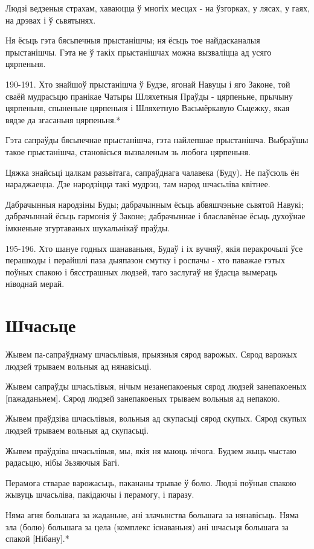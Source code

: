 \documentclass{article}
\begin{document}
Людзі ведзеныя страхам, хаваюцца ў многіх месцах - на ўзгорках, у
лясах, у гаях, на дрэвах і ў сьвятынях.

Ня ёсьць гэта бясьпечныя прыстанішчы; ня ёсьць тое найдасканалыя
прыстанішчы. Гэта не ў такіх прыстанішчах можна вызваліцца ад усяго
цярпеньня.

190-191. Хто знайшоў прыстанішча ў Будзе, ягонай Навуцы і яго Законе,
той сваёй мудрасьцю пранікае Чатыры Шляхетныя Праўды - цярпеньне,
прычыну цярпеньня, спыненьне цярпеньня і Шляхетную Васьмёркавую Сьцежку,
якая вядзе да згасаньня цярпеньня.*

Гэта сапраўды бясьпечнае прыстанішча, гэта найлепшае прыстанішча.
Выбраўшы такое прыстанішча, становісься вызваленым зь любога цярпеньня.

Цяжка знайсьці цалкам разьвітага, сапраўднага чалавека (Буду). Не
паўсюль ён нараджаецца. Дзе народзіцца такі мудрэц, там народ шчасьліва
квітнее.

Дабрачынныя народзіны Буды; дабрачынным ёсьць абвяшчэньне сьвятой
Навукі; дабрачыннай ёсьць гармонія ў Законе; дабрачыннае і блаславёнае
ёсьць духоўнае імкненьне згуртаваных шукальнікаў праўды.

195-196. Хто шануе годных шанаваньня, Будаў і іх вучняў, якія
перакрочылі ўсе перашкоды і перайшлі паза дыяпазон смутку і роспачы -
хто паважае гэтых поўных спакою і бясстрашных людзей, таго заслугаў ня
ўдасца вымераць ніводнай мерай.

\section{Шчасьце}

Жывем па-сапраўднаму шчасьлівыя, прыязныя сярод варожых. Сярод
варожых людзей трываем вольныя ад нянавісьці.

Жывем сапраўды шчасьлівыя, нічым незанепакоеныя сярод людзей
занепакоеных {[}пажаданьнем{]}. Сярод людзей занепакоеных трываем
вольныя ад непакою.

Жывем праўдзіва шчасьлівыя, вольныя ад скупасьці сярод скупых.
Сярод скупых людзей трываем вольныя ад скупасьці.

Жывем праўдзіва шчасьлівыя, мы, якія ня маюць нічога. Будзем жыць
чыстаю радасьцю, нібы Зьзяючыя Багі.

Перамога стварае варожасьць, пакананы трывае ў болю. Людзі поўныя
спакою жывуць шчасьліва, пакідаючы і перамогу, і паразу.

Няма агня большага за жаданьне, ані злачынства большага за
нянавісьць. Няма зла (болю) большага за цела (комплекс існаваньня) ані
шчасьця большага за спакой {[}Нібану{]}.*
\end{document}
